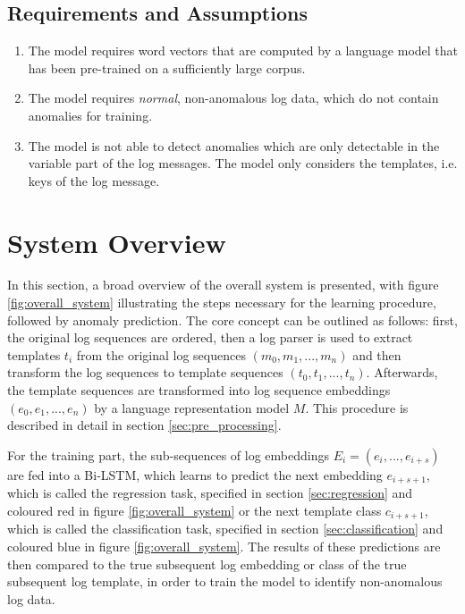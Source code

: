 \subsection{Requirements and Assumptions \label{sec:requirements_and_assumptions}}
\begin{enumerate}
	\item The model requires word vectors that are computed by a language model that has been pre-trained on a sufficiently large corpus.
	\item The model requires \textit{normal}, non-anomalous log data, which do not contain anomalies for training.
	\item The model is not able to detect anomalies which are only detectable in the variable part of the log messages. The model only considers the templates, i.e. keys of the log message.
\end{enumerate}



\section{System Overview \label{sec:overall_system}}
In this section, a broad overview of the overall system is presented, with figure \ref{fig:overall_system} illustrating the steps necessary for the learning procedure, followed by anomaly prediction. 
The core concept can be outlined as follows: first, the original log sequences are ordered, then a log parser is used to extract templates $t_i$ from the original log sequences $(m_0, m_1, ..., m_n)$ and then transform the log sequences to template sequences $(t_0, t_1, ..., t_n)$. Afterwards, the template sequences are transformed into log sequence embeddings $(e_0, e_1, ..., e_n)$ by a language representation model $M$. This procedure is described in detail in section \ref{sec:pre_processing}.

For the training part, the sub-sequences of log embeddings $E_i=(e_i,...,e_{i+s})$ are fed into a Bi-LSTM, which learns to predict the next embedding $e_{i+s+1}$, which is called the regression task, specified in section \ref{sec:regression} and coloured red in figure \ref{fig:overall_system} or the next template class $c_{i+s+1}$, which is called the classification task, specified in section \ref{sec:classification} and coloured blue in figure \ref{fig:overall_system}. The results of these predictions are then compared to the true subsequent log embedding or class of the true subsequent log template, in order to train the model to identify non-anomalous log data.

